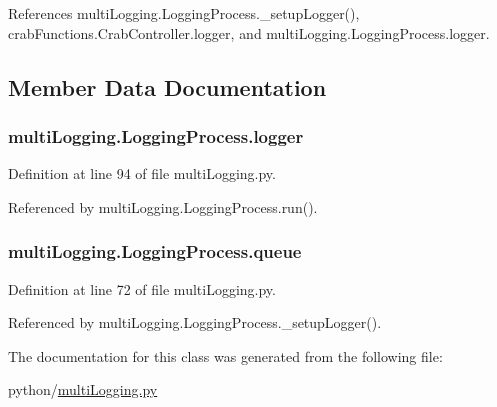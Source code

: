 References multi\-Logging.\-Logging\-Process.\-\_\-setup\-Logger(), crab\-Functions.\-Crab\-Controller.\-logger, and multi\-Logging.\-Logging\-Process.\-logger.



\subsection{Member Data Documentation}
\subsubsection[{logger}]{\setlength{\rightskip}{0pt plus 5cm}multi\-Logging.\-Logging\-Process.\-logger}\label{classmultiLogging_1_1LoggingProcess_a718e4642bead999dfe5d83a17865685d}


Definition at line 94 of file multi\-Logging.\-py.



Referenced by multi\-Logging.\-Logging\-Process.\-run().

\subsubsection[{queue}]{\setlength{\rightskip}{0pt plus 5cm}multi\-Logging.\-Logging\-Process.\-queue}\label{classmultiLogging_1_1LoggingProcess_a35897dd7cc4fca5ea50a77b94e1a02df}


Definition at line 72 of file multi\-Logging.\-py.



Referenced by multi\-Logging.\-Logging\-Process.\-\_\-setup\-Logger().



The documentation for this class was generated from the following file\-:\begin{DoxyCompactItemize}
\item 
python/\hyperlink{multiLogging_8py}{multi\-Logging.\-py}\end{DoxyCompactItemize}
